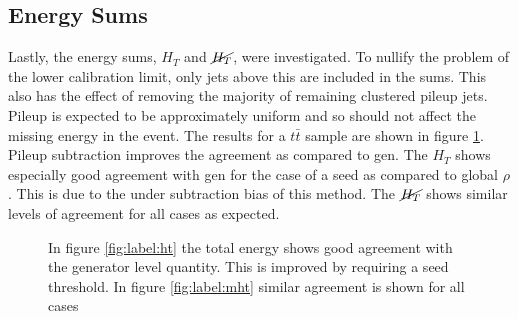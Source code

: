 \subsection{Energy Sums}
Lastly, the energy sums, $H_T$ and $\cancel{H_T}$, were investigated. To nullify the problem of the lower calibration limit, only jets above this are included in the sums. This also has the effect of removing the majority of remaining clustered pileup jets. Pileup is expected to be approximately uniform and so should not affect the missing energy in the event. The results for a $t\bar{t}$ sample are shown in figure \ref{fig:label:sums}. Pileup subtraction improves the agreement as compared to gen.  The $H_T$ shows especially good agreement with gen for the case of a seed as compared to global $\rho$. This is due to the under subtraction bias of this method. The $\cancel{H_T}$ shows similar levels of agreement for all cases as expected. 
\begin{figure}
\hfill
{}
\hfill
{}
\caption{In figure \ref{fig:label:ht} the total energy shows good agreement with the generator level quantity. This is improved by requiring a seed threshold. In figure \ref{fig:label:mht} similar agreement is shown for all cases}
\label{fig:label:sums}
\end{figure}
